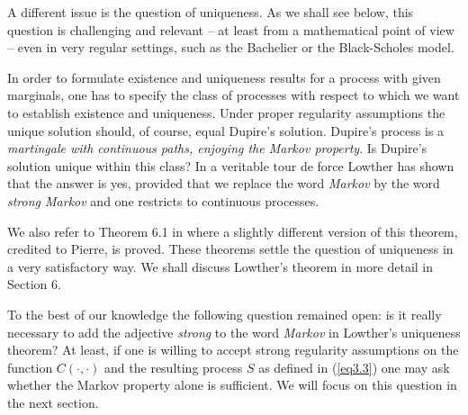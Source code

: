 \documentclass[11pt,a4paper]{article}%
\numberwithin{equation}{section}
\begin{document}
A different issue is the question of uniqueness. As we shall see below, this question is challenging and relevant -- at least from a mathematical point of view -- even in very regular settings, such as the Bachelier or the Black-Scholes model.

In order to formulate existence and uniqueness results for a process with given marginals, one has to specify the class of processes with respect to which we want to establish existence and uniqueness. Under proper regularity assumptions the unique solution should, of course, equal Dupire's solution. Dupire's process is a \textit{martingale with continuous paths, enjoying the Markov property}. Is Dupire's solution unique within this class? In a veritable tour de force Lowther  \cite{Lo08a, Lo08b} has shown  that the answer is yes, provided that we replace the word \textit{Markov} by the word \textit{strong Markov} and one restricts to continuous processes.

 We also refer to Theorem 6.1 in \cite{HiRoYo14} where a slightly different version of this theorem, credited to Pierre, is proved. These theorems settle the question of uniqueness in a very satisfactory way. We shall discuss Lowther's theorem in more detail in Section 6. 


To the best of our knowledge the following question remained open: is it really necessary to add the adjective \textit{strong} to the word \textit{Markov} in Lowther's uniqueness theorem? At least, if one is willing to accept strong regularity assumptions on the function $C(\cdot,\cdot)$ and the resulting process $S$ as defined in (\ref{eq3.3}) one may ask whether the Markov property alone is sufficient. We will focus on this question in the next section. %

 
\end{document}
